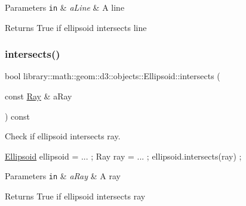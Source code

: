 \begin{DoxyParams}[1]{Parameters}
\mbox{\tt in}  & {\em a\+Line} & A line \\
\hline
\end{DoxyParams}
\begin{DoxyReturn}{Returns}
True if ellipsoid intersects line 
\end{DoxyReturn}
\mbox{\label{classlibrary_1_1math_1_1geom_1_1d3_1_1objects_1_1_ellipsoid_a8346f54be39644c22a5a8728ac368832}} 
\subsubsection{\texorpdfstring{intersects()}{intersects()}\hspace{0.1cm}{\footnotesize\ttfamily [4/9]}}
{\footnotesize\ttfamily bool library\+::math\+::geom\+::d3\+::objects\+::\+Ellipsoid\+::intersects (\begin{DoxyParamCaption}\item[{const \hyperlink{classlibrary_1_1math_1_1geom_1_1d3_1_1objects_1_1_ray}{Ray} \&}]{a\+Ray }\end{DoxyParamCaption}) const}



Check if ellipsoid intersects ray. 


\begin{DoxyCode}
\hyperlink{classlibrary_1_1math_1_1geom_1_1d3_1_1objects_1_1_ellipsoid_aae81fe0edc7f0e8d4590ea89ae73cb14}{Ellipsoid} ellipsoid = ... ;
Ray ray = ... ;
ellipsoid.intersects(ray) ;
\end{DoxyCode}



\begin{DoxyParams}[1]{Parameters}
\mbox{\tt in}  & {\em a\+Ray} & A ray \\
\hline
\end{DoxyParams}
\begin{DoxyReturn}{Returns}
True if ellipsoid intersects ray 
\end{DoxyReturn}
\mbox{\label{classlibrary_1_1math_1_1geom_1_1d3_1_1objects_1_1_ellipsoid_a6d447b106d193af47c6b201f7e01bd26}} 
